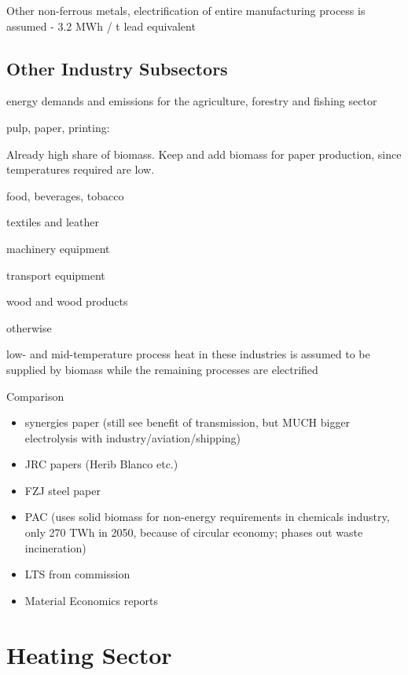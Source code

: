 Other non-ferrous metals, electrification of entire manufacturing process is assumed
- 3.2 MWh / t lead equivalent

\subsection{Other Industry Subsectors}

energy demands and \co emissions for the agriculture, forestry and fishing
sector

pulp, paper, printing:

Already high share of biomass. Keep and add biomass for paper production, since
temperatures required are low.

food, beverages, tobacco 

textiles and leather

machinery equipment


transport equipment

wood and wood products

otherwise

low- and mid-temperature process heat in these industries is assumed to be supplied by biomass
while the remaining processes are electrified

Comparison

\begin{itemize}
    \item synergies paper (still see benefit of transmission, but MUCH bigger electrolysis with industry/aviation/shipping) 
    \item JRC papers (Herib Blanco etc.) 
    \item FZJ steel paper
    \item PAC (uses solid biomass for non-energy requirements in chemicals industry, only 270 TWh in 2050, because of circular economy; phases out waste incineration) 
    \item LTS from commission 
    \item Material Economics reports 
\end{itemize}

\section{Heating Sector}

